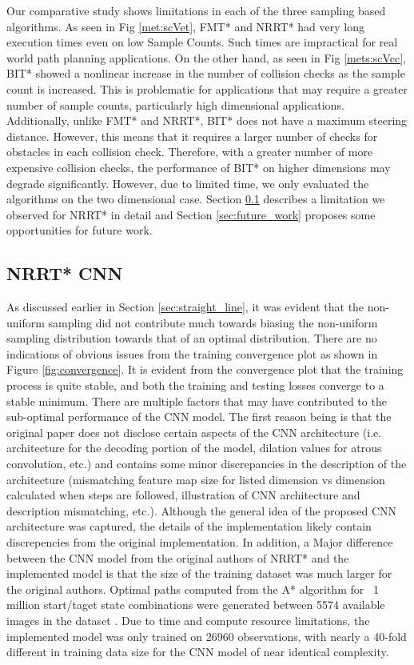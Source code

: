 \documentclass{article}
\begin{document}
Our comparative study shows limitations in each of the three sampling based algorithms. As seen in Fig \ref{met:scVet}, FMT* and NRRT* had very long execution times even on low Sample Counts. Such times are impractical for real world path planning applications. On the other hand, as seen in Fig \ref{mets:scVcc}, BIT* showed a nonlinear increase in the number of collision checks as the sample count is increased. This is problematic for applications that may require a greater number of sample counts, particularly high dimensional applications. Additionally, unlike FMT* and NRRT*, BIT* does not have a maximum steering distance. However, this means that it requires a larger number of checks for obstacles in each collision check. Therefore, with a greater number of more expensive collision checks, the performance of BIT* on higher dimensions may degrade significantly. However, due to limited time, we only evaluated the algorithms on the two dimensional case. Section \ref{sec:cnn_failure} describes a limitation we observed for NRRT* in detail and Section \ref{sec:future_work} proposes some opportunities for future work.

\subsection{NRRT* CNN}
\label{sec:cnn_failure}
As discussed earlier in Section \ref{sec:straight_line}, it was evident that the non-uniform sampling did not contribute much towards biasing the non-uniform sampling distribution towards that of an optimal distribution. There are no indications of obvious issues from the training convergence plot as shown in Figure \ref{fig:convergence}. It is evident from the convergence plot that the training process is quite stable, and both the training and testing losses converge to a stable minimum. There are multiple factors that may have contributed to the sub-optimal performance of the CNN model. The first reason being is that the original paper \cite{nrrt} does not disclose certain aspects of the CNN architecture (i.e. architecture for the decoding portion of the model, dilation values for atrous convolution, etc.) and contains some minor discrepancies in the description of the architecture (mismatching feature map size for listed dimension vs dimension calculated when steps are followed, illustration of CNN architecture and description mismatching, etc.). Although the general idea of the proposed CNN architecture was captured, the details of the implementation likely contain discrepencies from the original implementation. In addition, a Major difference between the CNN model from the original authors of NRRT* and the implemented model is that the size of the training dataset was much larger for the original authors. Optimal paths computed from the A* algorithm for ~1 million start/taget state combinations were generated between 5574 available images in the dataset \cite{dataset}. Due to time and compute resource limitations, the implemented model was only trained on 26960 observations, with nearly a 40-fold different in training data size for the CNN model of near identical complexity.
\end{document}
